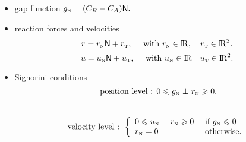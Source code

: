 {\begin{minipage}[c]{0.45\linewidth}
\begin{tikzpicture}
    \end{tikzpicture}
  \end{minipage}
\begin{minipage}[c]{0.49\linewidth}
    \begin{itemize}
    \item gap function $ g_{\n} = (C_B-C_A) \sf N.$
    \item reaction forces and  velocities
      $$r =  r_\n {\sf N} + r_\t, \quad \text{ with  } r_\n \in \nbR, \quad r_\t \in \nbR^2.$$
      $$u =  u_\n {\sf N} + u_\t, \quad \text{ with } u_\n \in \nbR \quad u_\t \in \nbR^2.$$
    \item Signorini conditions
      $$  \text{ position level : }  0 \leq g_{\n} \perp r_\n \geq 0.$$\\
      $$ \text{velocity level : }\left\{\begin{array}{ll}
            0 \leq u_{\n} \perp r_\n \geq 0  &\text{ if } g_{\n} \leq 0\\
            r_{\n} =0 &\text{ otherwise}.
          \end{array}\right.$$
    \end{itemize}

  \end{minipage}
}
